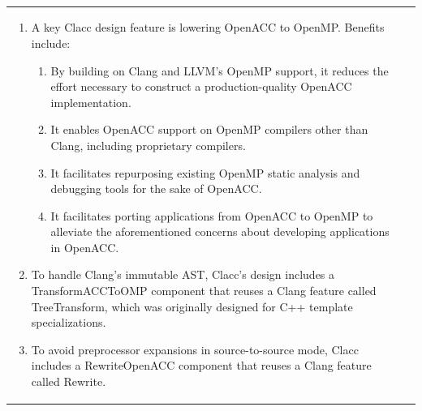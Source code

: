 ~
\vspace{-1em}

\begin{tabular}{@{\hspace{-1.5em}}p{}p{}@{}}

\begin{enumerate}

\item A key Clacc design feature is lowering OpenACC to OpenMP.
Benefits include:

\begin{enumerate}

\item By building on Clang and LLVM's OpenMP support, it reduces the
effort necessary to construct a production-quality OpenACC
implementation.

\item It enables OpenACC support on OpenMP compilers other than Clang,
including proprietary compilers.

\item It facilitates repurposing existing OpenMP static analysis and
debugging tools for the sake of OpenACC.

\item It facilitates porting applications from OpenACC to OpenMP to
alleviate the aforementioned concerns about developing applications in
OpenACC.

\end{enumerate}

\item To handle Clang's immutable AST, Clacc's design includes a
TransformACCToOMP component that reuses a Clang feature called
TreeTransform, which was originally designed for C++ template
specializations.

\item To avoid preprocessor expansions in source-to-source mode, Clacc
includes a RewriteOpenACC component that reuses a Clang feature called
Rewrite.

\end{enumerate}

&


\end{tabular}
